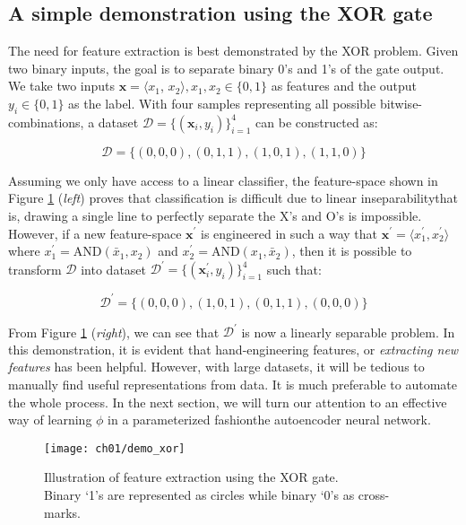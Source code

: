 \subsection{A simple demonstration using the XOR gate}

\par The need for feature extraction is best demonstrated by the XOR problem.
Given two binary inputs, the goal is to separate binary 0's and 1's of the gate
output. We take two inputs $\mathbf{x} = \langle x_{1}$, $x_{2} \rangle, x_1,
x_2 \in \{0,1\}$ as features and the output $y_{i} \in \{0,1\}$ as the label.
With four samples representing all possible bitwise-combinations, a dataset
$\mathcal{D}=\{(\mathbf{x}_{i}, y_{i})\}_{i=1}^{4}$ can be constructed as:

\[
    \mathcal{D} = \{(0,0,0), (0,1,1), (1,0,1), (1,1,0)\}
\]

Assuming we only have access to a linear classifier, the feature-space shown in
Figure \ref{demo:xor} (\textit{left}) proves that classification is difficult
due to linear inseparability\textemdash that is, drawing a single line to
perfectly separate the X's and O's is impossible.  However, if a new
feature-space $\mathbf{x}^{\prime}$ is engineered in such a way that
$\mathbf{x}^{\prime} = \langle {x}^{\prime}_{1}, {x}^{\prime}_2 \rangle$ where
$x^{\prime}_{1} = \text{AND}(\bar{x}_{1}, x_{2})$ and $x^{\prime}_{2} =
\text{AND}(x_{1}, \bar{x}_{2})$, then it is possible to transform $\mathcal{D}$
into dataset $\mathcal{D}^{\prime}=\{(\mathbf{x}^{\prime}_{i},
y_{i})\}_{i=1}^{4}$ such that:

\[
    \mathcal{D}^{\prime} = \{(0,0,0), (1,0,1), (0,1,1), (0,0,0)\}
\]

\par From Figure \ref{demo:xor} (\textit{right}), we can see that
$\mathcal{D}^{\prime}$ is now a linearly separable problem. In this
demonstration, it is evident that hand-engineering features, or
\textit{extracting new features} has been helpful. However, with large
datasets, it will be tedious to manually find useful representations from data.
It is much preferable to automate the whole process. In the next section, we
will turn our attention to an effective way of learning $\phi$ in a
parameterized fashion\textemdash the autoencoder neural network.

\begin{figure}[!t]
  \centering
  \texttt{[image: ch01/demo\_xor]}
  \caption[Illustration of feature extraction using the XOR gate]
    {Illustration of feature extraction using the XOR gate.\\ Binary `1's are
    represented as circles while binary `0's as cross-marks.}
  \label{demo:xor}
\end{figure}

